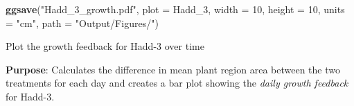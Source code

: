\documentclass[
  11pt,
]{article}
\newenvironment{Shaded}{\begin{snugshade}}{\end{snugshade}}
\newcommand{\AttributeTok}[1]{\textcolor[rgb]{0.13,0.29,0.53}{#1}}
\newcommand{\DecValTok}[1]{\textcolor[rgb]{0.00,0.00,0.81}{#1}}
\newcommand{\FunctionTok}[1]{\textcolor[rgb]{0.13,0.29,0.53}{\textbf{#1}}}
\newcommand{\NormalTok}[1]{#1}
\newcommand{\StringTok}[1]{\textcolor[rgb]{0.31,0.60,0.02}{#1}}
\begin{document}
\begin{Shaded}
\begin{Highlighting}[]
\FunctionTok{ggsave}\NormalTok{(}\StringTok{"Hadd\_3\_growth.pdf"}\NormalTok{, }\AttributeTok{plot =}\NormalTok{ Hadd\_3, }\AttributeTok{width =} \DecValTok{10}\NormalTok{, }\AttributeTok{height =} \DecValTok{10}\NormalTok{, }\AttributeTok{units =} \StringTok{"cm"}\NormalTok{, }\AttributeTok{path =} \StringTok{"Output/Figures/"}\NormalTok{)}
\end{Highlighting}
\end{Shaded}

Plot the growth feedback for Hadd-3 over time

\textbf{Purpose}: Calculates the difference in mean plant region area
between the two treatments for each day and creates a bar plot showing
the \emph{daily growth feedback} for Hadd-3.
\end{document}
